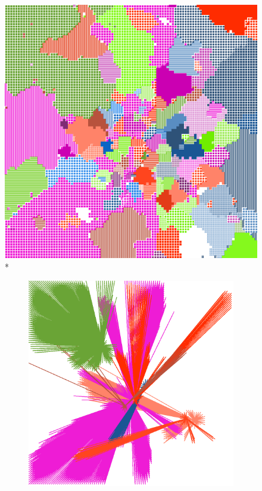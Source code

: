\documentclass[12pt,a4paper]{article}
\begin{document}
\begin{figure}[H]
\centering
\includegraphics[width=0.8\linewidth]{weekDef/1Mon.png}
\\*
\begin{subfigure}[b]{0.3\textwidth}
\includegraphics[width=\textwidth]{weekDef/edges-1Mon-big.png}
\end{subfigure}
\begin{subfigure}[b]{0.3\textwidth}

\end{subfigure}
\end{figure}
\end{document}
